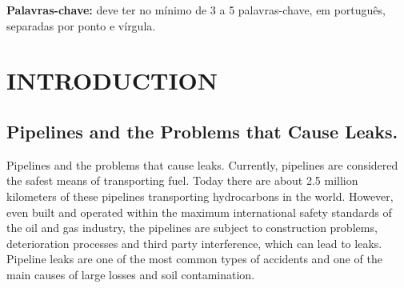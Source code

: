 \documentclass[
	article,			%
	12pt,				%
	oneside,			%
	a4paper,			%
	english,			%
	brazil,				%
	sumario=tradicional
	]{abntex2}
\begin{document}
   \vspace{\onelineskip}
   \noindent
   \textbf{Palavras-chave:} deve ter no mínimo de 3 a 5 palavras-chave, em português, separadas por ponto e vírgula.





\textual
\pagestyle{meuestilo}


\newpage

\section{\textbf{INTRODUCTION}}




\subsection{\textbf{Pipelines and the Problems that Cause Leaks.}}

Pipelines and the problems that cause leaks.
Currently, pipelines are considered the safest means of transporting fuel. 
Today there are about 2.5 million kilometers of these pipelines transporting hydrocarbons in the world\cite{aba}. 
However, even built and operated within the maximum international safety standards of the oil and gas industry, 
the pipelines are subject to construction problems, deterioration processes and third party interference, 
which can lead to leaks\cite{aba}\cite{gli}.
Pipeline leaks are one of the most common types of accidents and one of the main causes of large losses and soil 
contamination\cite{aba}\cite{lu}. 
\end{document}

